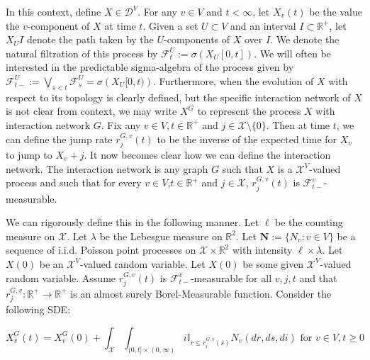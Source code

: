 \documentclass[12pt]{article}
\newcommand{\mb}{\mathbb}
\newcommand{\mc}{\mathcal}
\newcommand{\ra}{\rightarrow}
\newcommand{\ov}{\overline}
\newcommand{\te}{\text}
\newcommand{\ind}{\hspace{24pt}}
\newcommand{\defeq}{:=}								%
\newcommand{\cad}{\mc{D}}							%
\newcommand{\sta}{\mc{X}}							%
\newcommand{\cl}[1]{\ov{#1}}						%
\newcommand{\Xf}{X}									%
\newcommand{\poiss}{N}								%
\newcommand{\leb}{\lambda}							%
\newcommand{\Sm}{\ell}								%
\newcommand{\rate}{r}								%
\newcommand{\F}{\mc{F}}								%
\newcommand{\poisses}{\mathbf{N}}					%
\newcommand{\poissv}[1]{_{#1}}						%
\newcommand{\vind}[1]{_{#1}}						%
\newcommand{\tme}[1]{(#1)}							%
\newcommand{\tmi}[1]{#1}							%
\newcommand{\gind}[1]{^{#1}}						%
\newcommand{\vpara}[1]{^{#1}}						%
\newcommand{\stpara}[1]{_{#1}}						%
\newcommand{\tpara}[1]{_{#1}}						%
\newcommand{\gvpara}[2]{^{#1,#2}}					%
\begin{document}
\ind In this context, define \(\Xf \in \cad\vpara{V}\). For any \(v \in V\) and \(t < \infty\), let \(\Xf\vind{v}\tme{t}\) be the value the \(v\)-component of \(\Xf\) at time \(t\). Given a set \(U\subset V\) and an interval \(I \subset \mb{R}^+\), let \(\Xf\vind{U}\tmi{I}\) denote the path taken by the \(U\)-components of \(\Xf\) over \(\tmi{I}\). We denote the natural filtration of this process by \(\F\vpara{U}\tpara{t} \defeq \sigma \left(\Xf\vind{U}\tmi{[0,t]}\right)\). We will often be interested in the predictable sigma-algebra of the process given by \(\F\vpara{U}\tpara{t-} \defeq \bigvee_{s < t} \F\vpara{U}\tpara{s} = \sigma\left(\Xf\vind{U}\tmi{[0,t)}\right)\). Furthermore, when the evolution of \(\Xf\) with respect to its topology is clearly defined, but the specific interaction network of \(\Xf\) is not clear from context, we may write \(\Xf\gind{G}\) to represent the process \(\Xf\) with interaction network \(G\). Fix any \(v \in V,t \in \mb{R}^+\) and \(j \in \sta\setminus\{0\}\). Then at time \(t\), we can define the jump rate \(\rate\gvpara{G}{v}\stpara{j}(t)\) to be the inverse of the expected time for \(\Xf\vind{v}\) to jump to \(\Xf\vind{v} + j\). It now becomes clear how we can define the interaction network. The interaction network is any graph \(G\) such that \(\Xf\) is a \(\sta^V\)-valued process and such that for every \(v \in V\),\(t\in \mb{R}^+\) and \(j \in \sta\), \(\rate\gvpara{G}{v}\stpara{j}(t)\) is \(\F\vpara{v}\tpara{t-}\)-measurable. 

\ind We can rigorously define this in the following manner. Let \(\Sm\) be the counting measure on \(\sta\). Let \(\leb\) be the Lebesgue measure on \(\mb{R}^2\). Let \(\poisses \defeq \{\poiss\poissv{v}:v \in V\}\) be a sequence of i.i.d. Poisson point processes on \(\sta\times \mb{R}^2\) with intensity \(\Sm\times \leb\). Let \(\Xf\tme{0}\) be an \(\sta^V\)-valued random variable. Let \(\Xf\tme{0}\) be some given \(\sta^V\)-valued random variable. Assume \(\rate\gvpara{G}{v}\stpara{j}(t)\) is \(\F\vpara{\cl{v}}\tpara{t-}\)-measurable for all \(v,j,t\) and that \(\rate\gvpara{G}{v}\stpara{j}:\mb{R}^+ \ra\mb{R}^+\) is an almost surely Borel-Measurable function. Consider the following SDE:

\begin{equation}
\Xf\gind{G}\vind{v}\tme{t} = \Xf\gind{G}\vind{v}\tme{0} + \int_{\sta}\int_{(0,t]\times (0,\infty)} i\mb{I}_{r \leq \rate\gvpara{G}{v}\stpara{i}(s)} \poiss\poissv{v}\left(dr,ds,di\right) \te{ for } v\in V, t \geq 0
\label{p::Xf}
\end{equation}
\end{document}

